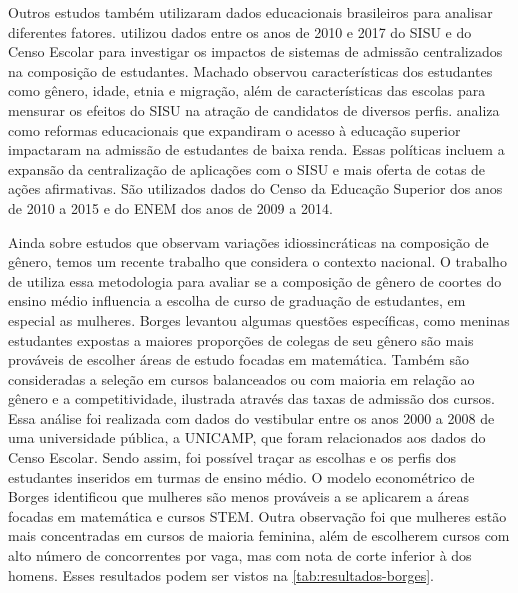 Outros estudos também utilizaram dados educacionais brasileiros para analisar diferentes fatores. \citet{Machado2021} utilizou dados entre os anos de 2010 e 2017 do SISU e do Censo Escolar para investigar os impactos de sistemas de admissão centralizados na composição de estudantes. Machado observou características dos estudantes como gênero, idade, etnia e migração, além de características das escolas para mensurar os efeitos do SISU na atração de candidatos de diversos perfis. \citet{Mello2022} analiza como reformas educacionais que expandiram o acesso à educação superior impactaram na admissão de estudantes de baixa renda. Essas políticas incluem a expansão da centralização de aplicações com o SISU e mais oferta de cotas de ações afirmativas. São utilizados dados do Censo da Educação Superior dos anos de 2010 a 2015 e do ENEM dos anos de 2009 a 2014.

Ainda sobre estudos que observam variações idiossincráticas na composição de gênero, temos um recente trabalho que considera o contexto nacional. O trabalho de \citet{Borges2021} utiliza essa metodologia para avaliar se a composição de gênero de coortes do ensino médio influencia a escolha de curso de graduação de estudantes, em especial as mulheres. Borges levantou algumas questões específicas, como meninas estudantes expostas a maiores proporções de colegas de seu gênero são mais prováveis de escolher áreas de estudo focadas em matemática. Também são consideradas a seleção em cursos balanceados ou com maioria em relação ao gênero e a competitividade, ilustrada através das taxas de admissão dos cursos. Essa análise foi realizada com dados do vestibular entre os anos 2000 a 2008 de uma universidade pública, a UNICAMP, que foram relacionados aos dados do Censo Escolar. Sendo assim, foi possível traçar as escolhas e os perfis dos estudantes inseridos em turmas de ensino médio. O modelo econométrico de Borges identificou que mulheres são menos prováveis a se aplicarem a áreas focadas em matemática e cursos STEM. Outra observação foi que mulheres estão mais concentradas em cursos de maioria feminina, além de escolherem cursos com alto número de concorrentes por vaga, mas com nota de corte inferior à dos homens. Esses resultados podem ser vistos na \autoref{tab:resultados-borges}.
